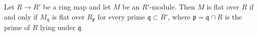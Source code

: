 \begin{lemma}
\label{lem:pc-flat-source-local}
Let $R\to R'$ be a ring map and let $M$ be an $R'$-module.  Then $M$ is
flat over $R$ if and only if $M_{\mathfrak q}$ is flat over
$R_{\mathfrak p}$ for every prime $\mathfrak q\subset R'$, where
$\mathfrak p=\mathfrak q\cap R$ is the prime of $R$ lying under
$\mathfrak q$.
\mathlibok\ 
\end{lemma}
